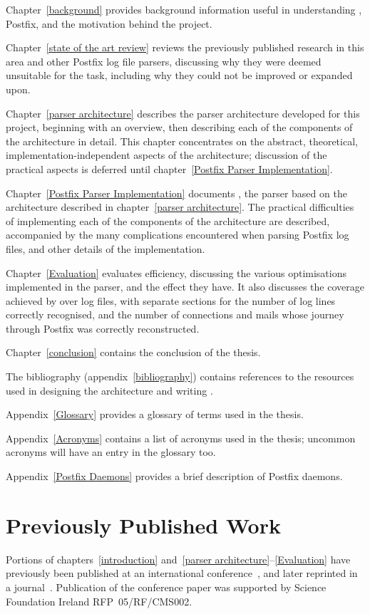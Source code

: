 Chapter~\ref{background} provides background information useful in
understanding , Postfix, and the motivation behind the
project.

Chapter~\ref{state of the art review} reviews the previously published
research in this area and other Postfix log file parsers, discussing why
they were deemed unsuitable for the task, including why they could not be
improved or expanded upon.

Chapter~\ref{parser architecture} describes the parser architecture
developed for this project, beginning with an overview, then describing
each of the components of the architecture in detail.  This chapter
concentrates on the abstract, theoretical, implementation-independent
aspects of the architecture; discussion of the practical aspects is
deferred until chapter~\ref{Postfix Parser Implementation}.

Chapter~\ref{Postfix Parser Implementation} documents \parsername{}, the
parser based on the architecture described in chapter~\ref{parser
architecture}.  The practical difficulties of implementing each of the
components of the architecture are described, accompanied by the many
complications encountered when parsing Postfix log files, and other details
of the implementation.

Chapter~\ref{Evaluation} evaluates \parsernames{} efficiency, discussing
the various optimisations implemented in the parser, and the effect they
have.  It also discusses the coverage achieved by \parsername{} over
\numberOFlogFILES{} log files, with separate sections for the number of log
lines correctly recognised, and the number of connections and mails whose
journey through Postfix was correctly reconstructed.

Chapter~\ref{conclusion} contains the conclusion of the thesis.

The bibliography (appendix~\ref{bibliography}) contains references to the
resources used in designing the architecture and writing \parsername{}.

Appendix~\ref{Glossary} provides a glossary of terms used in the thesis.

Appendix~\ref{Acronyms} contains a list of acronyms used in the thesis;
uncommon acronyms will have an entry in the glossary too.

Appendix~\ref{Postfix Daemons} provides a brief description of Postfix
daemons.

\section{Previously Published Work}

Portions of chapters~\ref{introduction} and~\ref{parser
architecture}--\ref{Evaluation} have previously been published at an
international conference~\cite{sgai-2008}, and later reprinted in a
journal~\cite{elsevier-2009}.  Publication of the conference paper was
supported by Science Foundation Ireland RFP~05/RF/CMS002.
